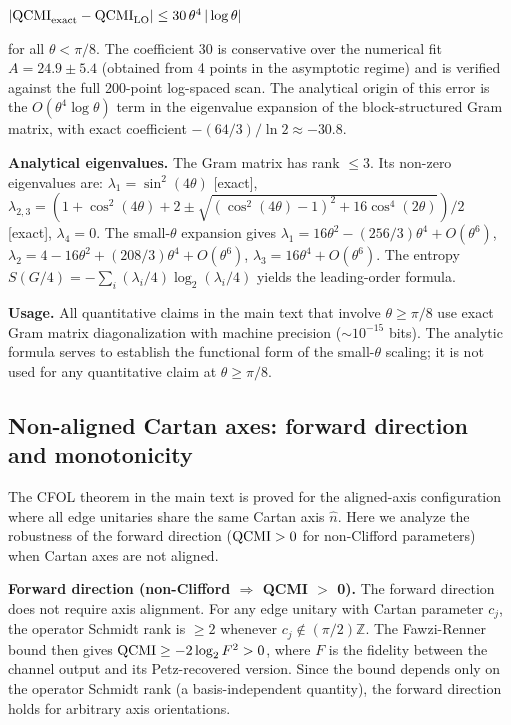 \documentclass[aps,prl,superscriptaddress,nofootinbib]{revtex4-2}
\begin{document}
$|{\rm QCMI}_{\rm exact} - {\rm QCMI}_{\rm LO}| \leq 30\,\theta^4\,|\log\theta|$

for all $\theta < \pi/8$. The coefficient $30$ is conservative over the numerical fit $A = 24.9 \pm 5.4$ (obtained from 4 points in the asymptotic regime) and is verified against the full 200-point log-spaced scan. The analytical origin of this error is the $O(\theta^4\log\theta)$ term in the eigenvalue expansion of the block-structured Gram matrix, with exact coefficient $-(64/3)/\ln 2 \approx -30.8$.

\textbf{Analytical eigenvalues.} The Gram matrix has rank $\leq 3$. Its non-zero eigenvalues are: $\lambda_1 = \sin^2(4\theta)$ [exact], $\lambda_{2,3} = (1+\cos^2(4\theta)+2 \pm \sqrt{(\cos^2(4\theta)-1)^2 + 16\cos^4(2\theta)})/2$ [exact], $\lambda_4 = 0$. The small-$\theta$ expansion gives $\lambda_1 = 16\theta^2 - (256/3)\theta^4 + O(\theta^6)$, $\lambda_2 = 4 - 16\theta^2 + (208/3)\theta^4 + O(\theta^6)$, $\lambda_3 = 16\theta^4 + O(\theta^6)$. The entropy $S(G/4) = -\sum_i (\lambda_i/4)\log_2(\lambda_i/4)$ yields the leading-order formula.

\textbf{Usage.} All quantitative claims in the main text that involve $\theta \geq \pi/8$ use exact Gram matrix diagonalization with machine precision ($\sim10^{-15}$ bits). The analytic formula serves to establish the functional form of the small-$\theta$ scaling; it is not used for any quantitative claim at $\theta \geq \pi/8$.

\subsection{Non-aligned Cartan axes: forward direction and monotonicity}

The CFOL theorem in the main text is proved for the aligned-axis configuration where all edge unitaries share the same Cartan axis $\hat{n}$. Here we analyze the robustness of the forward direction (${\rm QCMI}>0$ for non-Clifford parameters) when Cartan axes are not aligned.

\textbf{Forward direction (non-Clifford $\Rightarrow$ QCMI $>$ 0).} The forward direction does not require axis alignment. For any edge unitary with Cartan parameter $c_j$, the operator Schmidt rank is $\geq 2$ whenever $c_j \notin (\pi/2)\mathbb{Z}$. The Fawzi-Renner bound then gives ${\rm QCMI} \geq -2\log_2 F^2 > 0$, where $F$ is the fidelity between the channel output and its Petz-recovered version. Since the bound depends only on the operator Schmidt rank (a basis-independent quantity), the forward direction holds for arbitrary axis orientations.
\end{document}
